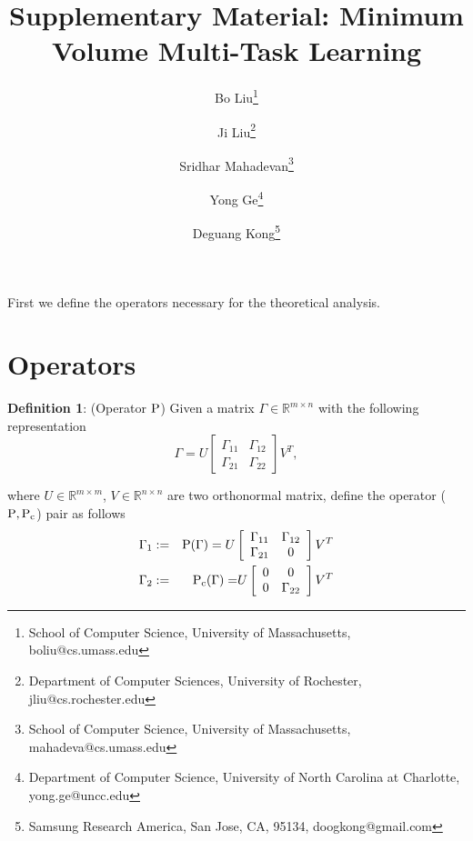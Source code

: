 \documentclass[twoside,leqno,twocolumn]{article}
\begin{document}

\title{\Large Supplementary Material: Minimum Volume Multi-Task Learning}
\author{Bo Liu\thanks{School of Computer Science, University of Massachusetts, boliu@cs.umass.edu}
\and
Ji Liu\thanks{Department of Computer Sciences, University of Rochester, jliu@cs.rochester.edu}
\and 
Sridhar Mahadevan\thanks{School of Computer Science, University of Massachusetts, mahadeva@cs.umass.edu}
\and
Yong Ge\thanks{Department of Computer Science, University of North Carolina at Charlotte, yong.ge@uncc.edu}
\and
Deguang Kong\thanks{Samsung Research America, San Jose, CA, 95134, doogkong@gmail.com} 
}
\date{}

\maketitle



First we define the operators necessary for the theoretical analysis.


\section{Operators}

\textbf{Definition 1}: (Operator $\rm{P}$) Given a matrix $\Gamma\in{\mathbb{R}^{m\times n}}$
with the following representation
\[
\Gamma=U\left[{\begin{array}{cc}
{\Gamma_{11}} & {\Gamma_{12}}\\
{\Gamma_{21}} & {\Gamma_{22}}
\end{array}}\right]{V^{T}},
\]


where $U\in{\mathbb{R}^{m\times m}}$, $V\in{\mathbb{R}^{n\times n}}$
are two orthonormal matrix, define the operator (${\rm P,P_{c}}$) pair
as follows
\begin{eqnarray}
\nonumber
\Gamma_{1} &:=& {\rm{P}(\Gamma)}=U\left[{\begin{array}{cc}
{\Gamma_{11}} & {\Gamma_{12}}\\
{\Gamma_{21}} & 0
\end{array}}\right]{V^{T}}\\
\nonumber
\Gamma_{2} &:=& {\rm{P_{c}}(\Gamma)=}U\left[{\begin{array}{cc}
0 & 0\\
0 & {\Gamma_{22}}
\end{array}}\right]{V^{T}}
\end{eqnarray}
\end{document}
